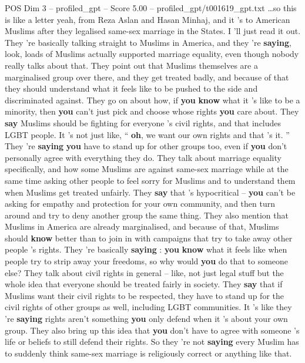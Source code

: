 \begin{textsample}{POS Dim 3 – profiled\_gpt – Score 5.00 – profiled\_gpt/t001619\_gpt.txt}  \label{ex:f3_pos_023}
…so this is like a letter yeah, from Reza Aslan and Hasan Minhaj, and it ’s to American Muslims after they legalised same-sex marriage in the States.
I ’ll just read it out.
They ’re basically talking straight to Muslims in America, and they ’re \textbf{saying}, look, loads of Muslims actually supported marriage equality, even though nobody really talks about that.
They point out that Muslims themselves are a marginalised group over there, and they get treated badly, and because of that they should understand what it feels like to be pushed to the side and discriminated against.
They go on about how, if \textbf{you} \textbf{know} what it ’s like to be a minority, then \textbf{you} can't just pick and choose whose rights \textbf{you} care about.
They \textbf{say} Muslims should be fighting for everyone ’s civil rights, and that includes LGBT people.
It ’s not just like, “ \textbf{oh}, we want our own rights and that ’s it. ” They ’re \textbf{saying} \textbf{you} have to stand up for other groups too, even if \textbf{you} don't personally agree with everything they do.
They talk about marriage equality specifically, and how some Muslims are against same-sex marriage while at the same time asking other people to feel sorry for Muslims and to understand them when Muslims get treated unfairly.
They \textbf{say} that ’s hypocritical – \textbf{you} can't be asking for empathy and protection for your own community, and then turn around and try to deny another group the same thing.
They also mention that Muslims in America are already marginalised, and because of that, Muslims should \textbf{know} better than to join in with campaigns that try to take away other people ’s rights.
They ’re basically \textbf{saying} : \textbf{you} \textbf{know} what it feels like when people try to strip away your freedoms, so why would \textbf{you} do that to someone else?
They talk about civil rights in general – like, not just legal stuff but the whole idea that everyone should be treated fairly in society.
They \textbf{say} that if Muslims want their civil rights to be respected, they have to stand up for the civil rights of other groups as well, including LGBT communities.
It ’s like they ’re \textbf{saying} rights aren't something \textbf{you} only defend when it ’s about your own group.
They also bring up this idea that \textbf{you} don't have to agree with someone ’s life or beliefs to still defend their rights.
So they ’re not \textbf{saying} every Muslim has to suddenly think same-sex marriage is religiously correct or anything like that.

\end{textsample}
